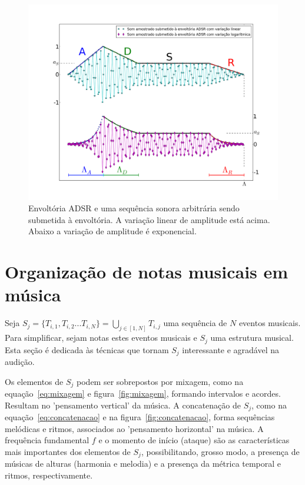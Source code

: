 \begin{figure}[htpq!]
    \centering
        \includegraphics[width=\textwidth]{figuras/adsr}
    \caption{Envoltória ADSR e uma sequência sonora arbitrária sendo submetida à envoltória. A variação linear de amplitude está acima. Abaixo a variação de amplitude é exponencial.}
\end{figure}
        \label{fig:adsr}



\clearpage
\section{Organização de notas musicais em música}\label{notasMusica}
Seja $ S_j=\{T_{i,1},T_{i,2}...T_{i,N}\} =\bigcup_{j \in [1,N]} T_{i,j} $ uma sequência de $N$ eventos
musicais. Para simplificar, sejam notas estes eventos musicais
e $S_j$ uma estrutura musical. Esta seção é dedicada às técnicas
que tornam $S_j$ interessante e agradável na audição.

Os elementos de $S_j$ podem ser sobrepostos por mixagem, como na equação~\ref{eq:mixagem} e figura~\ref{fig:mixagem}, formando intervalos e acordes. Resultam no 'pensamento vertical' da música. A concatenação de $S_j$, como na equação~\ref{eq:concatenacao} e na figura~\ref{fig:concatenacao}, forma sequências melódicas e ritmos, associados ao 'pensamento horizontal' na música. A frequência fundamental $f$ e o momento de início (ataque) são as características mais importantes dos elementos de $S_j$, possibilitando, grosso modo, a presença de músicas de alturas (harmonia e melodia) e a presença da métrica temporal e ritmos, respectivamente.



